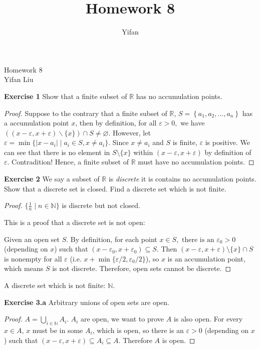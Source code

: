 \documentclass[12pt]{article}
\title{Homework 8}
\author{Yifan}
\newcommand{\bbN}{\mathbb{N}}
\newcommand{\bbR}{\mathbb{R}}
\theoremstyle{definition}
\numberwithin{equation}{subsection}
\begin{document}
\pagestyle{plain}



\begin{center}
{\large Homework 8} \\
\vspace{.2in}
Yifan Liu
\end{center}

\bigskip \bigskip


\textbf{Exercise 1} Show that a finite subset of $\bbR$ has no accumulation points.
\begin{proof}
    Suppose to the contrary that a finite subset of $\bbR$, $S=\left\{a_{1}, a_{2}, \ldots, a_{n}\right\}$ has a accumulation point $x$, then by definition, for all $\varepsilon>0,$ we have $((x-\varepsilon, x+\varepsilon) \backslash\{x\}) \cap S \neq \varnothing$. However, let $\varepsilon = \min\{|x-a_i| \mid a_i \in S, x \neq a_i\}$. Since $x \neq a_i$ and $S$ is finite, $\varepsilon$ is positive. We can see that there is no element in $S\setminus \{x\}$ within $(x-\varepsilon, x+\varepsilon)$ by definition of $\varepsilon$. Contradition! Hence, a finite subset of $\bbR$ must have no accumulation points. 
\end{proof}

\textbf{Exercise 2} We say a subset of $\bbR$ is \textit{discrete} it is contains no accumulation points.
Show that a discrete set is closed. Find a discrete set which is not finite.
\begin{proof}
    $\{\frac{1}{n} \mid n \in \bbN\}$ is discrete but not closed. 

    This is a proof that a discrete set is not open:

    Given an open set $S$. By definition, for each point $x \in S, \text { there is an } \varepsilon_0>0 $ (depending on $x$) such that $(x-\varepsilon_0, x+\varepsilon_0) \subseteq S .$ Then $(x-\varepsilon, x+\varepsilon)\setminus\{x\} \cap S$ is nonempty for all $\varepsilon$ (i.e. $x+ \min\{\varepsilon/2, \varepsilon_0/2\}$), so $x$ is an accumulation point, which means $S$ is not discrete. Therefore, open sets cannot be discrete.
\end{proof}
A discrete set which is not finite: $\bbN$. 
\bigskip

\textbf{Exercise 3.a} Arbitrary unions of open sets are open.
\begin{proof}
    $A=\bigcup_{i \in \mathbb{N}} A_{i}$. $A_i$ are open, we want to prove $A$ is also open. For every $x \in A$, $x$ must be in some $A_i$, which is open, so there is an $\varepsilon>0 $ (depending on $x$) such that $(x-\varepsilon, x+\varepsilon) \subseteq A_i \subseteq A.$ Therefore $A$ is open. 
\end{proof}
\end{document}
